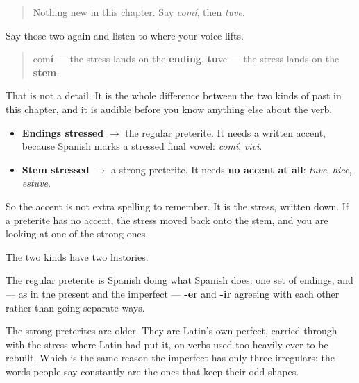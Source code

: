 \label{lesson:ES-C15-sintesis-preterito}



\begin{quote}
Nothing new in this chapter. Say \emph{comí}, then \emph{tuve}.
\end{quote}

\begin{grammarlens}[title={Grammar Lens: the stress tells you everything}]
Say those two again and listen to where your voice lifts.

\begin{quote}
com\textbf{í} — the stress lands on the \textbf{ending}. \textbf{tu}ve — the stress lands on the \textbf{stem}.
\end{quote}

That is not a detail. It is the whole difference between the two kinds of past in this chapter, and it is audible before you know anything else about the verb.

\begin{itemize}
\raggedright
  \item \textbf{Endings stressed} $\to$ the regular preterite. It needs a written accent, because Spanish marks a stressed final vowel: \emph{comí}, \emph{viví}.
  \item \textbf{Stem stressed} $\to$ a strong preterite. It needs \textbf{no accent at all}: \emph{tuve}, \emph{hice}, \emph{estuve}.
\end{itemize}

So the accent is not extra spelling to remember. It is the stress, written down. If a preterite has no accent, the stress moved back onto the stem, and you are looking at one of the strong ones.
\end{grammarlens}

\begin{grammarlens}[title={What you've built}]
The two kinds have two histories.

The regular preterite is Spanish doing what Spanish does: one set of endings, and — as in the present and the imperfect — \textbf{-er} and \textbf{-ir} agreeing with each other rather than going separate ways.

The strong preterites are older. They are Latin's own perfect, carried through with the stress where Latin had put it, on verbs used too heavily ever to be rebuilt. Which is the same reason the imperfect has only three irregulars: the words people say constantly are the ones that keep their odd shapes.
\end{grammarlens}

